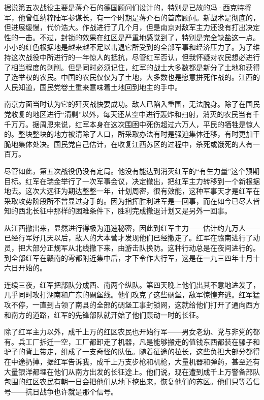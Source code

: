 \documentclass[10pt]{book}
\begin{document}
据说第五次战役主要是蒋介石的德国顾问们设计的，特别是已故的冯·西克特将军，他曾任纳粹陆军参谋长，有一个时期是蒋介石的首席顾问。新战术是彻底的，但进展缓慢，代价浩大。作战进行了几个月，但是南京对敌军主力还没有打出决定性的一击。不过，封锁的效果在红区是严重地感觉到了，特别是完全缺盐这一点。小小的红色根据地是越来越不足以击退它所受到的全部军事和经济压力了。为了维持这次战役中所进行的一年惊人的抵抗，尽管红军否认，但我怀疑对农民想必进行了相当程度的剥削。但是同时必须记住，红军的战士大多数都是新分了土地和获得了选举权的农民。中国的农民仅仅为了土地，大多数也是愿意拼死作战的。江西的人民知道，国民党卷土重来意味着土地回到地主的手中。

南京方面当时认为它的歼灭战快要成功。敌人已陷入重围，无法脱身。除了在国民党收复的地区进行“清剿”以外，每天还从空中进行轰炸和扫射，消灭的农民当有千千万万。据周恩来说，红军本身在这次围困中死伤超过六万人，平民的牺牲是惊人的。整块整块的地方被清除了人口，所采取办法有时是强迫集体迁移，有时更加干脆地集体处决。国民党自己估计，在收复江西苏区的过程中，杀死或饿死的人有一百万。

尽管如此，第五次战役仍没有定局。他没有能达到消灭红军的“有生力量”这个预期目标。红军在瑞金举行了一次军事会议，决定撤出，把红军主力转移到一个新根据地去。这次大远征为期达整整一年，计划周密，很有效能，这种军事天才是红军在采取攻势阶段所不曾显过身手的。因为指挥胜利进军是一回事，而在如今已尽人皆知的西北长征中那样的困难条件下，胜利完成撤退计划又是另外一回事。

从江西撤出来，显然进行得极为迅速秘密，因此到红军主力——估计约九万人——已经行军好几天以后，敌人的大本营才发现他们已经撤走了。红军在赣南进行了动员，把大部分正规军从北线撤下来，由游击队换防。这种行动总是在夜间进行的。到全部红军在赣南的雩都附近集中后，才下令作大行军，这是在一九三四年十月十六日开始的。

连续三夜，红军把部队分成西、南两个纵队。第四天晚上他们出其不意地进发了，几乎同时攻打湖南和广东的碉堡线。他们攻克了这些碉堡，敌军惊惶奔逃。红军猛攻不停，一直到占领了南县的全部的碉堡工事封锁网，这就给他们打开了通向西方和南方的道路，红军的先锋部队就开始了他们轰动一时的长征。

除了红军主力以外，成千上万的红区农民也开始行军——男女老幼、党与非党的都有。兵工厂拆迁一空，工厂都卸走了机器，凡是能够搬走的值钱东西都装在骡子和驴子的背上带走，组成了一支奇怪的队伍。随着征途的拉长，这些负担大部分都得在中途扔掉，据红军告诉我，成千上万支步枪和机枪，大量机器和弹药，甚至还有大量银洋都埋在他们从南方出发的长征途上。他们说，现在遭到成千上万警备部队包围的红区农民有朝一日会把他们从地下挖出来，恢复他们的苏区。他们只等着信号——抗日战争也许就是那个信号。
\end{document}
